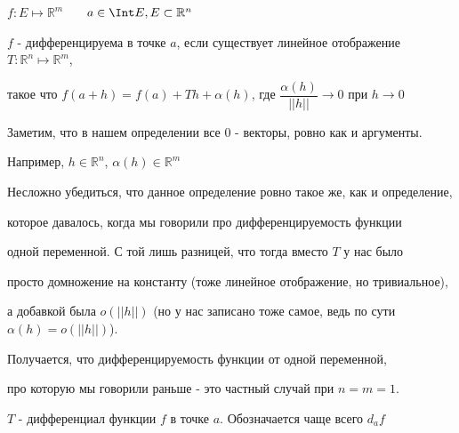 \begin{definition} \thmslashn

    $f: E \mapsto \mathbb{R}^m$ \ \ \ $a \in \Int E, E \subset \mathbb{R}^n$

    $f$ - дифференцируема в точке $a$, если существует линейное отображение $T: \mathbb{R}^n \mapsto \mathbb{R}^m$,

    такое что $f(a + h) = f(a) + Th + \alpha(h)$, где $\dfrac{\alpha(h)}{||h||} \rightarrow 0$ при $h \rightarrow 0$

\end{definition}

\begin{remark} \thmslashn

    Заметим, что в нашем определении все 0 - векторы, ровно как и аргументы. 

    Например, $h \in \mathbb{R}^n$, $\alpha(h) \in \mathbb{R}^m$

\end{remark}

\begin{remark} \thmslashn

    Несложно убедиться, что данное определение ровно такое же, как и определение,

    которое давалось, когда мы говорили про дифференцируемость функции

    одной переменной. С той лишь разницей, что тогда вместо $T$  у нас было 

    просто домножение на константу (тоже линейное отображение, но тривиальное),

    а добавкой была $o(||h||)$ (но у нас записано тоже самое, ведь по сути $\alpha(h) = o(||h||)$). 

    Получается, что дифференцируемость функции от одной переменной,

    про которую мы говорили раньше - это частный случай при $n = m = 1$.

\end{remark}

\begin{definition} \thmslashn

    $T$ - дифференциал функции $f$ в точке $a$. Обозначается чаще всего $d_af$

\end{definition}

